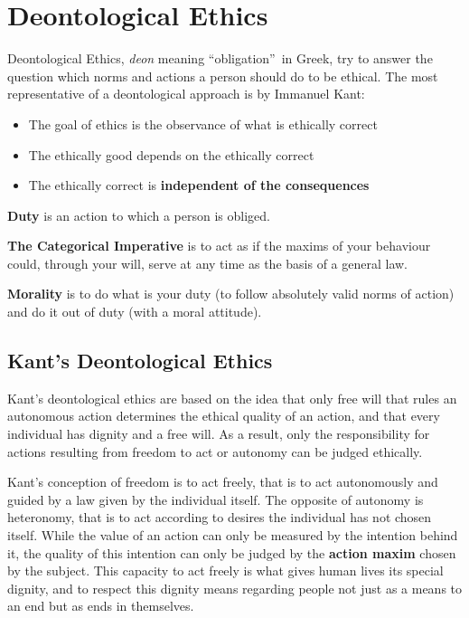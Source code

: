 \documentclass[11pt]{article}
\theoremstyle{definition}
\begin{document}
\section{Deontological Ethics}
Deontological Ethics, \textit{deon} meaning \textquotedblleft obligation\textquotedblright\ in Greek, try to answer the question which norms and actions a person should do to be ethical. The most representative of a deontological approach is by Immanuel Kant:
\begin{itemize}[noitemsep]
	\item The goal of ethics is the observance of what is ethically correct
	\item The ethically good depends on the ethically correct
	\item The ethically correct is \textbf{independent of the consequences}
\end{itemize}

\begin{definition}
	\textbf{Duty} is an action to which a person is obliged. \parencite{kant1870grundlegung}
\end{definition}

\begin{definition}
	\textbf{The Categorical Imperative} is to act as if the maxims of your behaviour could, through your will, serve at any time as the basis of a general law. \parencite{kant1870grundlegung}
\end{definition}

\begin{definition}
	\textbf{Morality} is to do what is your duty (to follow absolutely valid norms of action) and do it out of duty (with a moral attitude).
\end{definition}

\subsection{Kant's Deontological Ethics}
Kant's deontological ethics are based on the idea that only free will that rules an autonomous action determines the ethical quality of an action, and that every individual has dignity and a free will. As a result, only the responsibility for actions resulting from freedom to act or autonomy can be judged ethically.

Kant's conception of freedom is to act freely, that is to act autonomously and guided by a law given by the individual itself. The opposite of autonomy is heteronomy, that is to act according to desires the individual has not chosen itself. While the value of an action can only be measured by the intention behind it, the quality of this intention can only be judged by the \textbf{action maxim} chosen by the subject. This capacity to act freely is what gives human lives its special dignity, and to respect this dignity means regarding people not just as a means to an end but as ends in themselves.
\end{document}

